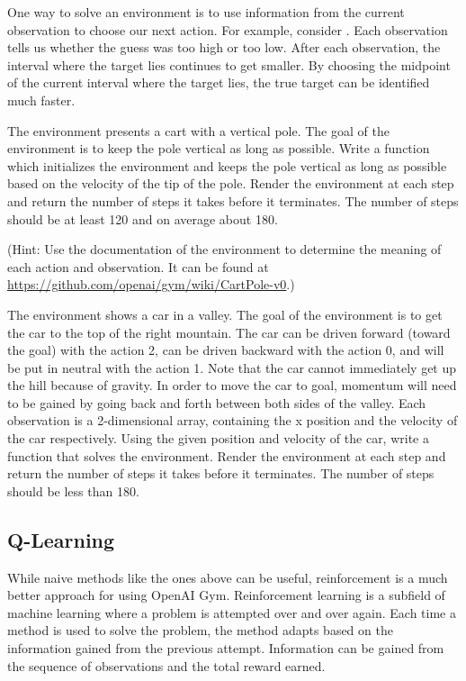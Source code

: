One way to solve an environment is to use information from the current observation to choose our next action.
For example, consider .
Each observation tells us whether the guess was too high or too low.
After each observation, the interval where the target lies continues to get smaller.
By choosing the midpoint of the current interval where the target lies, the true target can be identified much faster.

\begin{problem}
The environment  presents a cart with a vertical pole.
The goal of the environment is to keep the pole vertical as long as possible.
Write a function  which initializes the environment and keeps the pole vertical as long as possible based on the velocity of the tip of the pole.
Render the environment at each step and return the number of steps it takes before it terminates.
The number of steps should be at least 120 and on average about 180.

(Hint: Use the documentation of the environment to determine the meaning of each action and observation.
It can be found at \url{https://github.com/openai/gym/wiki/CartPole-v0}.)
\label{prob:cartpole}
\end{problem}

\begin{problem}
The environment  shows a car in a valley.
The goal of the environment is to get the car to the top of the right mountain.
The car can be driven forward (toward the goal) with the action 2, can be driven backward with the action 0, and will be put in neutral with the action 1.
Note that the car cannot immediately get up the hill because of gravity.
In order to move the car to goal, momentum will need to be gained by going back and forth between both sides of the valley.
Each observation is a 2-dimensional array, containing the x position and the velocity of the car respectively.
Using the given position and velocity of the car, write a function  that solves the  environment.
Render the environment at each step and return the number of steps it takes before it terminates.
The number of steps should be less than 180.

\label{prob:car}
\end{problem}

\subsection*{Q-Learning}
While naive methods like the ones above can be useful, reinforcement is a much better approach for using OpenAI Gym.
Reinforcement learning is a subfield of machine learning where a problem is attempted over and over again. Each time a method is used to solve the problem, the method adapts based on the information gained from the previous attempt.
Information can be gained from the sequence of observations and the total reward earned.

